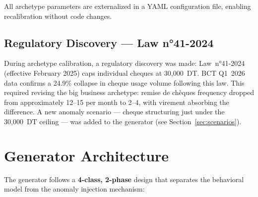 All archetype parameters are externalized in a YAML configuration file,
enabling recalibration without code changes.

\subsection{Regulatory Discovery --- Law n°41-2024}

During archetype calibration, a regulatory discovery was made: Law~n°41-2024
(effective February 2025) caps individual cheques at 30,000~DT. BCT Q1~2026
data confirms a 24.9\% collapse in cheque usage volume following this law.
This required revising the big business archetype: remise de chèques frequency
dropped from approximately 12--15 per month to 2--4, with virement absorbing
the difference. A new anomaly scenario --- cheque structuring just under the
30,000~DT ceiling --- was added to the generator (see Section~\ref{sec:scenarios}).

\section{Generator Architecture}

The generator follows a \textbf{4-class, 2-phase} design that separates the
behavioral model from the anomaly injection mechanism:

